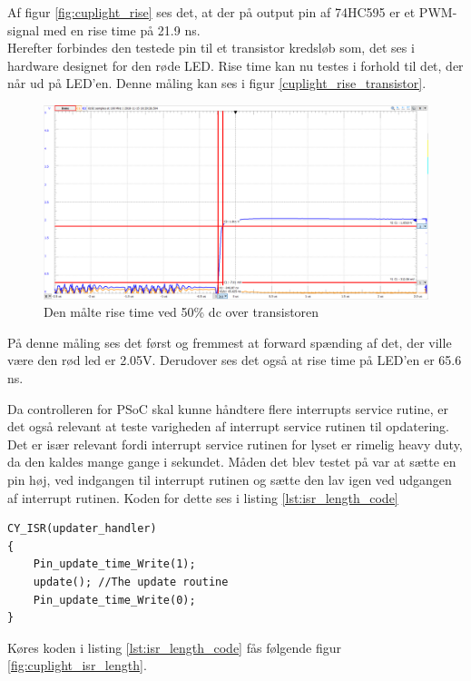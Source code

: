 \documentclass[Modultest/Modultest_main.tex]{subfiles}
\begin{document}
Af figur \ref{fig:cuplight_rise} ses det, at der på output pin af 74HC595 er et PWM-signal med en rise time på 21.9 ns. 
\\Herefter forbindes den testede pin til et transistor kredsløb som, det ses i hardware designet for den røde LED. Rise time kan nu testes i forhold til det, der når ud på LED'en. Denne måling kan ses i figur \ref{cuplight_rise_transistor}.

\begin{figure}[H]
    \centering
    \includegraphics[width=\textwidth]{Modultest/CupLight/graphics/CupLight_rise_time_transistor.png}
    \caption{Den målte rise time ved 50\% dc over transistoren}
    \label{fig:cuplight_rise_transistor}
\end{figure}

På denne måling ses det først og fremmest at forward spænding af det, der ville være den rød led er 2.05V. Derudover ses det også at rise time på LED'en er 65.6 ns.

Da controlleren for PSoC skal kunne håndtere flere interrupts service rutine, er det også relevant at teste varigheden af interrupt service rutinen til opdatering. Det er især relevant fordi interrupt service rutinen for lyset er rimelig heavy duty, da den kaldes mange gange i sekundet. Måden det blev testet på var at sætte en pin høj, ved indgangen til interrupt rutinen og sætte den lav igen ved udgangen af interrupt rutinen. Koden for dette ses i listing \ref{lst:isr_length_code}
\begin{lstlisting}[caption={Kode for at teste længden af interrupt service rutinen}, label={lst:isr_length_code}]
CY_ISR(updater_handler)
{
    Pin_update_time_Write(1);
    update(); //The update routine
    Pin_update_time_Write(0);
}  
\end{lstlisting}

Køres koden i listing  \ref{lst:isr_length_code} fås følgende figur \ref{fig:cuplight_isr_length}.
\end{document}
